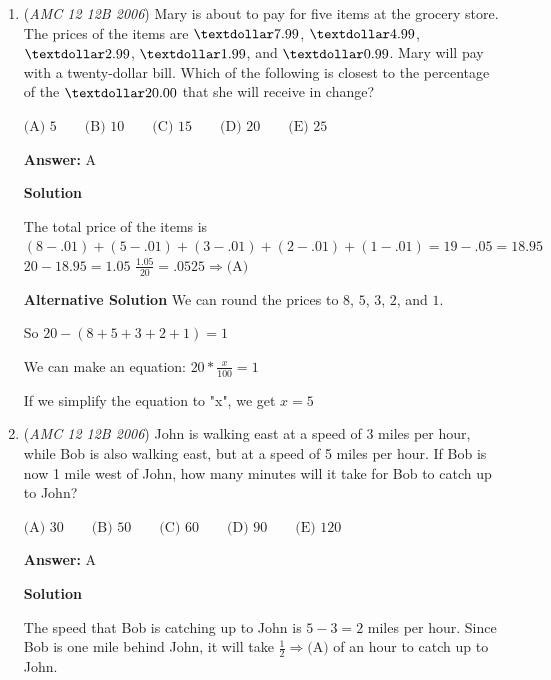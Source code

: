 \begin{enumerate}
Let the Panthers' score be $x$. The Cougars then scored $x+14$. Since the teams combined scored $34$, we get $x+x+14=34 \\ \rightarrow 2x+14=34 \\ \rightarrow 2x=20 \\ \rightarrow x = 10$, 

 and the answer is  $\boxed{\text{(A)}}$.

 


	\item (\textit{AMC 12 12B 2006}) Mary is about to pay for five items at the grocery store.  The prices of the items are $\textdollar7.99$, $\textdollar4.99$, $\textdollar2.99$, $\textdollar1.99$, and $\textdollar0.99$.  Mary will pay with a twenty-dollar bill.  Which of the following is closest to the percentage of the $\textdollar20.00$ that she will receive in change?


 $\text {(A) } 5 \qquad \text {(B) } 10 \qquad \text {(C) } 15 \qquad \text {(D) } 20 \qquad \text {(E) } 25$

 \textbf{Answer: }A



\textbf{Solution}

The total price of the items is $(8-.01)+(5-.01)+(3-.01)+(2-.01)+(1-.01)=19-.05=18.95$
$20-18.95=1.05$
$\frac{1.05}{20}=.0525 \Rightarrow \text{(A)}$

 \textbf{Alternative Solution} We can round the prices to $8$, $5$, $3$, $2$, and $1$. 

 So $20 - (8+5+3+2+1) = 1$

 We can make an equation: $20* \frac{x}{100}=1$

 If we simplify the equation to "x", we get $x=5$



	\item (\textit{AMC 12 12B 2006}) John is walking east at a speed of 3 miles per hour, while Bob is also walking east, but at a speed of 5 miles per hour.  If Bob is now 1 mile west of John, how many minutes will it take for Bob to catch up to John?


 $\text {(A) } 30 \qquad \text {(B) } 50 \qquad \text {(C) } 60 \qquad \text {(D) } 90 \qquad \text {(E) } 120$

 \textbf{Answer: }A



\textbf{Solution}

The speed that Bob is catching up to John is $5-3=2$ miles per hour. Since Bob is one mile behind John, it will take $\frac{1}{2} \Rightarrow \text{(A)}$ of an hour to catch up to John.


\end{enumerate}
